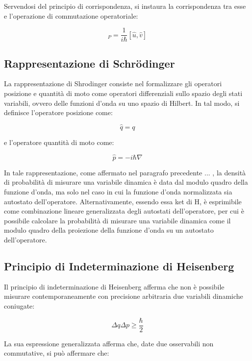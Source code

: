 \documentclass{article}
\begin{document}
Servendosi del principio di corrispondenza, si instaura la corrispondenza tra esse e l'operazione di commutazione operatoriale:

\begin{equation}
    [u,v]_P = \frac{1}{i\hbar}[\hat{u},\hat{v}]
\end{equation}

\subsection{Rappresentazione di Schrödinger}
La rappresentazione di Shrodinger consiste nel formalizzare gli operatori posizione e quantità di moto come operatori differenziali sullo spazio degli stati variabili,
ovvero delle funzioni d'onda su uno spazio di Hilbert.
In tal modo, si definisce l'operatore posizione come:

\begin{equation}
    \hat{q} = q
\end{equation}

e l'operatore quantità di moto come:

\begin{equation}
    \hat{p} = -i\hbar \nabla
\end{equation}

In tale rappresentazione, come affermato nel paragrafo precedente ... , la densità di probabilità di misurare una variabile dinamica è data dal modulo quadro della funzione d'onda, ma solo
nel caso in cui la funzione d'onda normalizzata sia autostato dell'operatore.
Alternativamente, essendo essa ket di H, è esprimibile come combinazione lineare generalizzata degli autostati dell'operatore,
per cui è possibile calcolare la probabilità di misurare una variabile dinamica come il modulo quadro della proiezione della funzione d'onda su un autostato dell'operatore.

\subsection{Principio di Indeterminazione di Heisenberg}
Il principio di indeterminazione di Heisenberg afferma che non è possibile misurare contemporaneamente con precisione arbitraria due variabili dinamiche coniugate:

\begin{equation}
    \Delta q \Delta p \geq \frac{\hbar}{2}
\end{equation}

La sua espressione generalizzata afferma che, date due osservabili non commutative, si può affermare che:
\end{document}
